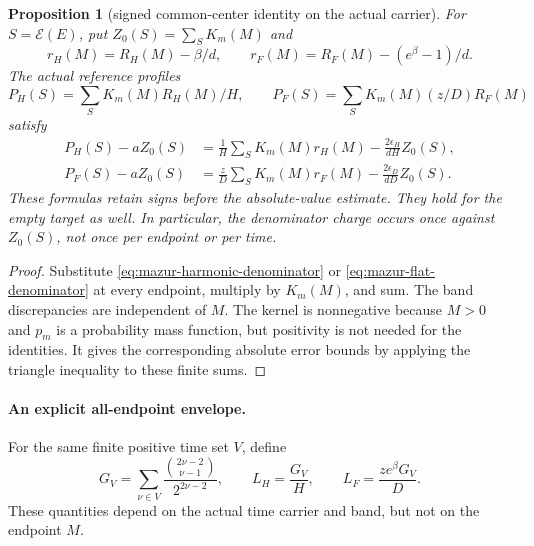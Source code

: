 \documentclass[11pt]{article}
\newtheorem{proposition}{Proposition}
\theoremstyle{remark}\newtheorem{remark}[proposition]{Remark}
\begin{document}
\begin{proposition}[signed common-center identity on the actual carrier]
\label{prop:mazur-profile-residual}
For $S=\mathcal E(E)$, put $Z_0(S)=\sum_SK_m(M)$ and
\[
 r_H(M)=R_H(M)-\beta/d,\qquad
 r_F(M)=R_F(M)-(e^\beta-1)/d.
\]
The actual reference profiles
\[
 P_H(S)=\sum_SK_m(M)R_H(M)/H,\qquad
 P_F(S)=\sum_SK_m(M)(z/D)R_F(M)
\]
satisfy
\begin{align}
 P_H(S)-aZ_0(S)
 &=\frac1H\sum_SK_m(M)r_H(M)
                -\frac{2\epsilon_H}{dH}Z_0(S),\\
 P_F(S)-aZ_0(S)
 &=\frac zD\sum_SK_m(M)r_F(M)
                -\frac{2\epsilon_D}{dD}Z_0(S).
 \label{eq:mazur-common-signed}
\end{align}
These formulas retain signs before the absolute-value estimate.
They hold for the empty target as well. In particular, the
denominator charge occurs once against $Z_0(S)$, not once per
endpoint or per time.
\end{proposition}
\begin{proof}
Substitute \eqref{eq:mazur-harmonic-denominator} or
\eqref{eq:mazur-flat-denominator} at every endpoint, multiply by
$K_m(M)$, and sum. The band discrepancies are independent of $M$.
The kernel is nonnegative because $M>0$ and $p_m$ is a probability
mass function, but positivity is not needed for the identities.
It gives the corresponding absolute error bounds by applying the
triangle inequality to these finite sums.
\end{proof}

\paragraph{An explicit all-endpoint envelope.}
For the same finite positive time set $V$, define
\[
 G_V=\sum_{\nu\in V}
         \frac{\binom{2\nu-2}{\nu-1}}{2^{2\nu-2}},\qquad
 L_H=\frac{G_V}{H},\qquad L_F=\frac{z e^\beta G_V}{D}.
\]
These quantities depend on the actual time carrier and band,
but not on the endpoint $M$.
\end{document}
